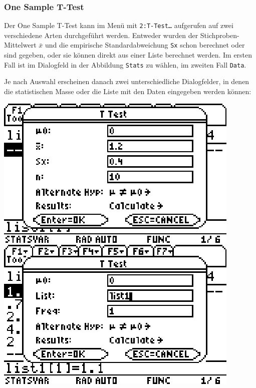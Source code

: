 \documentclass[a4paper,11pt,notitlepage,halfparskip,headsepline,normalheadings,twoside]{scrartcl}
\newlength{\tikey}
\newcommand{\keystroke}[1]{\settowidth{\tikey}{\scriptsize #1}\psframebox[framearc=0.2]{\parbox{\tikey}{\scriptsize\textsf{#1}}}}
\begin{document}
\subsubsection{One Sample T-Test}
\begin{window}
Der One Sample T-Test kann im Menü \keystroke{F6} mit \texttt{2:T-Test\ldots}
aufgerufen auf zwei verschiedene Arten durchgeführt werden. Entweder wurden der
Stichproben-Mittelwert \texttt{$\bar{x}$} und die empirische Standardabweichung
\texttt{Sx} schon berechnet oder sind gegeben, oder sie können direkt aus einer
Liste berechnet werden. Im ersten Fall ist im Dialogfeld in der Abbildung
\texttt{Stats} zu wählen, im zweiten Fall \texttt{Data}.
\end{window}

Je nach Auswahl erscheinen danach zwei unterschiedliche Dialogfelder, in denen
die statistischen Masse oder die Liste mit den Daten eingegeben werden können:

\begin{center}
\includegraphics{eps/tstats.eps}
\includegraphics{eps/tdata.eps}
\end{center}
\end{document}
